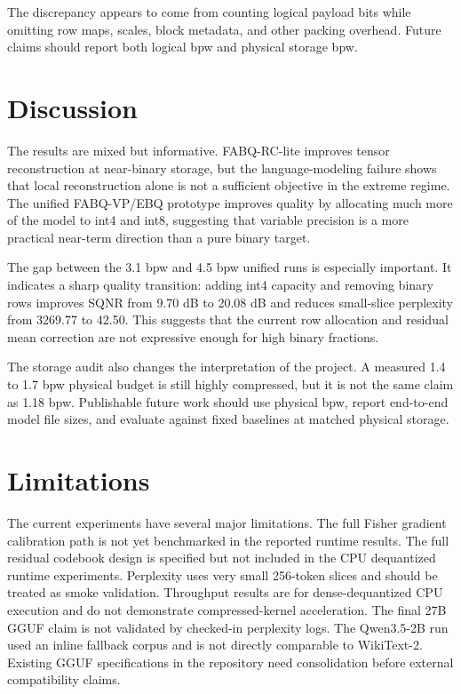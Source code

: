 \documentclass[11pt]{article}
\begin{document}
The discrepancy appears to come from counting logical payload bits while omitting row maps, scales, block metadata, and other packing overhead. Future claims should report both logical bpw and physical storage bpw.

\section{Discussion}

The results are mixed but informative. FABQ-RC-lite improves tensor reconstruction at near-binary storage, but the language-modeling failure shows that local reconstruction alone is not a sufficient objective in the extreme regime. The unified FABQ-VP/EBQ prototype improves quality by allocating much more of the model to int4 and int8, suggesting that variable precision is a more practical near-term direction than a pure binary target.

The gap between the 3.1 bpw and 4.5 bpw unified runs is especially important. It indicates a sharp quality transition: adding int4 capacity and removing binary rows improves SQNR from 9.70 dB to 20.08 dB and reduces small-slice perplexity from 3269.77 to 42.50. This suggests that the current row allocation and residual mean correction are not expressive enough for high binary fractions.

The storage audit also changes the interpretation of the project. A measured 1.4 to 1.7 bpw physical budget is still highly compressed, but it is not the same claim as 1.18 bpw. Publishable future work should use physical bpw, report end-to-end model file sizes, and evaluate against fixed baselines at matched physical storage.

\section{Limitations}

The current experiments have several major limitations. The full Fisher gradient calibration path is not yet benchmarked in the reported runtime results. The full residual codebook design is specified but not included in the CPU dequantized runtime experiments. Perplexity uses very small 256-token slices and should be treated as smoke validation. Throughput results are for dense-dequantized CPU execution and do not demonstrate compressed-kernel acceleration. The final 27B GGUF claim is not validated by checked-in perplexity logs. The Qwen3.5-2B run used an inline fallback corpus and is not directly comparable to WikiText-2. Existing GGUF specifications in the repository need consolidation before external compatibility claims.
\end{document}
